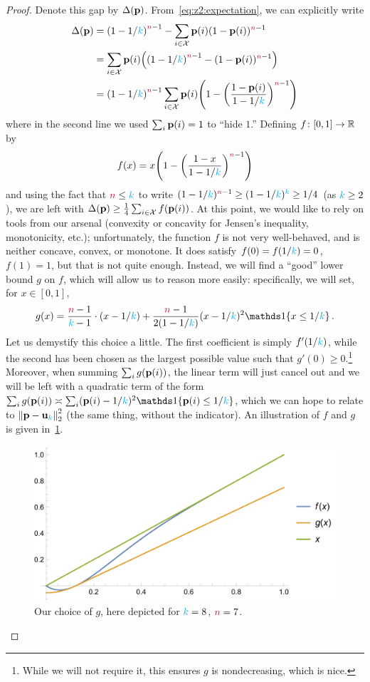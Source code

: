 \begin{proof}
Denote this gap by $\Delta(\mathbf{p})$. 
From~\eqref{eq:z2:expectation}, we can explicitly write
\begin{align*}
  \Delta(\p) 
  &= \Paren{1-1/\ab}^{\ns-1} - \sum_{i\in\domain} \p(i)(1-\p(i))^{\ns-1} \\
  &= \sum_{i\in\domain} \p(i)\Paren{ \Paren{1-1/\ab}^{\ns-1} - (1-\p(i))^{\ns-1} } \\
  &= \Paren{1-1/\ab}^{\ns-1}\sum_{i\in\domain} \p(i)\Paren{ 1 - \Paren{\frac{1-\p(i)}{1-1/\ab}}^{\ns-1} }
\end{align*}
where in the second line we used $\sum_i \mathbf{p}(i)=1$ to ``hide $1$.'' Defining $f\colon[0,1]\to\mathbb{R}$ by 
\[
  f(x) = x\Paren{ 1 - \Paren{\frac{1-x}{1-1/\ab}}^{\ns-1} }
\] and using the fact that ${\textcolor{purple}{n}} \leq {\textcolor{cyan}{k}}$  to write $(1-1/{\textcolor{cyan}{k}})^{{\textcolor{purple}{n}}-1} \geq (1-1/{\textcolor{cyan}{k}})^{{\textcolor{cyan}{k}}} \geq 1/4$ (as ${\textcolor{cyan}{k}} \geq 2$), we are left with
$
  \Delta(\mathbf{p}) \geq \frac{1}{4}\sum_{i\in\mathcal{X}} f(\mathbf{p}(i))
$. At this point, we would like to rely on tools from our arsenal (convexity or concavity for Jensen's inequality, monotonicity, etc.); unfortunately, the function $f$ is not very well-behaved, and is neither concave, convex, or monotone. It does satisfy $f(0)=f(1/{\textcolor{cyan}{k}})=0$, $f(1)=1$, but that is not quite enough. Instead, we will find a ``good'' lower bound $g$ on $f$, which will allow us to reason more easily: specifically, we will set, for $x\in[0,1]$,
\[
    g(x) = \frac{\ns-1}{\ab-1}\cdot (x-1/\ab) + \frac{\ns-1}{2(1-1/\ab)}(x-1/\ab)^2\indic{x\leq 1/\ab}\,.
\] 
Let us demystify this choice a little. The first coefficient is simply $f'\Paren{1/\ab}$, while the second has been chosen as the largest possible value such that $g'(0)\geq 0$.\footnote{While we will not require it, this ensures $g$ is nondecreasing, which is nice.} Moreover, when summing $\sum_i g(\mathbf{p}(i))$, the linear term will just cancel out and we will be left with a quadratic term of the form $\sum_i g(\p(i)) \asymp \sum_i (\p(i)-1/\ab)^2\indic{\p(i)\leq 1/\ab}$, which we can hope to relate to $\normtwo{\p-\uniform_\ab}^2$ (the same thing, without the indicator). An illustration of $f$ and $g$ is given in~\cref{fig:z2:fg}.

\begin{figure}[ht]\centering
  \includegraphics[width=1.0\textwidth]{figures/fig-uniformity-z2-fg}
  \caption{\label{fig:z2:fg}Our choice of $g$, here depicted for ${\textcolor{cyan}{k}}=8$, ${\textcolor{purple}{n}}=7$.}
\end{figure}


\end{proof}
